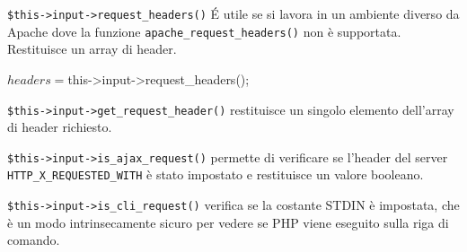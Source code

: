 \verb|$this->input->request_headers()| \'E utile se si lavora in un ambiente diverso da Apache dove la funzione \verb|apache_request_headers()| non è supportata. Restituisce un array di header.

\begin{code}
$headers = $this->input->request_headers();
\end{code}

\verb|$this->input->get_request_header()| restituisce un singolo elemento dell'array di header richiesto.


\verb|$this->input->is_ajax_request()| permette di verificare se l'header del server \verb|HTTP_X_REQUESTED_WITH| è stato impostato e restituisce un valore booleano.

\verb|$this->input->is_cli_request()| verifica se la costante STDIN è impostata, che è un modo intrinsecamente sicuro per vedere se PHP viene eseguito sulla riga di comando.

